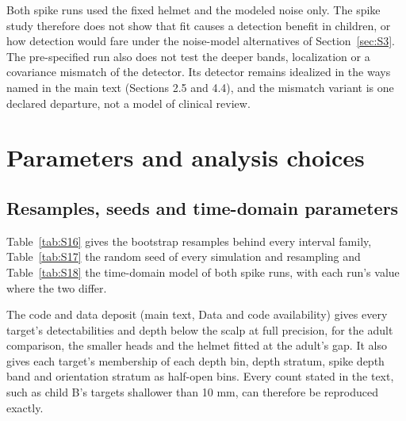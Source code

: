 \documentclass[preprint,12pt,authoryear,a4paper]{elsarticle}
\begin{document}
Both spike runs used the fixed helmet and the modeled noise only. The spike study therefore does not show that fit causes a detection benefit in children, or how detection would fare under the noise-model alternatives of Section~\ref{sec:S3}. The pre-specified run also does not test the deeper bands, localization or a covariance mismatch of the detector. Its detector remains idealized in the ways named in the main text (Sections 2.5 and 4.4), and the mismatch variant is one declared departure, not a model of clinical review.

\section{Parameters and analysis choices}\label{sec:S8}

\subsection{Resamples, seeds and time-domain parameters}\label{sec:S8.1}

Table~\ref{tab:S16} gives the bootstrap resamples behind every interval family, Table~\ref{tab:S17} the random seed of every simulation and resampling and Table~\ref{tab:S18} the time-domain model of both spike runs, with each run's value where the two differ.

The code and data deposit (main text, Data and code availability) gives every target's detectabilities and depth below the scalp at full precision, for the adult comparison, the smaller heads and the helmet fitted at the adult's gap. It also gives each target's membership of each depth bin, depth stratum, spike depth band and orientation stratum as half-open bins. Every count stated in the text, such as child B's targets shallower than 10 mm, can therefore be reproduced exactly.
\end{document}
